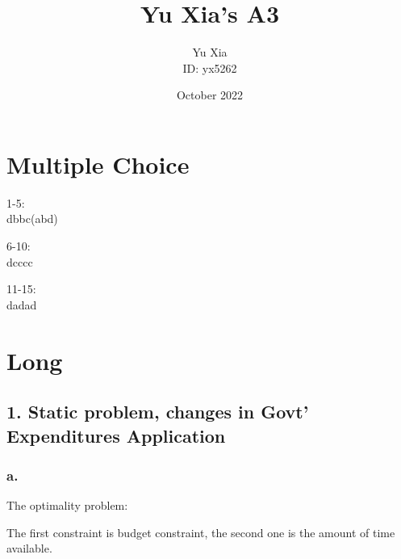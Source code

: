 \documentclass{article}
\author{Yu Xia \\ ID: yx5262}
\title{\textbf{Yu Xia's A3}}
\date{October 2022}
\begin{document}
\maketitle

\nocite{*}

\section*{\textrm{Multiple Choice}}

1-5:\\
dbbc(abd)

6-10:\\
dcccc

11-15:\\
dadad

\section*{\textrm{Long}}

\subsection*{\textrm{1. Static problem, changes in Govt' Expenditures Application}}

\subsubsection*{\textrm{a.}}

The optimality problem:


The first constraint is budget constraint, the second one is the amount of time available.
\end{document}
